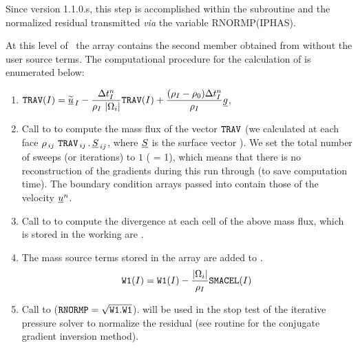 Since version 1.1.0.s, this step is accomplished within the subroutine  and the normalized residual transmitted \textit{via} the variable RNORMP(IPHAS).

At this level of \CS \, the array  contains the second member obtained from  without the user source terms. The computational procedure for the calculation of  is enumerated below:

\begin{enumerate}

\item $\displaystyle \text{\texttt{TRAV}}(I) = \widetilde{\underline{u}}_{\,I} - \frac {\Delta t^n_I} {\rho_I \ |\Omega_i|} \text{\texttt{TRAV}}(I) + \frac{(\rho_I - \rho_0 ) \Delta t^n_I }{\rho_I} \underline{g}$,
\item Call to  to compute the mass flux of the vector $\text{\texttt{TRAV}}$ (we calculated at each face  $\displaystyle \rho_{\,ij} \ \var{TRAV}_{\,ij}\,.\,\vect{S}_{\,ij}$, where $\underline{S}$ is the surface vector ). We set the total number of sweeps (or iterations) to $1$ ( = 1), which means that there is no reconstruction of the gradients during this run through  (to save computation time). The boundary condition arrays passed into  contain those of the velocity $\underline{u}^n$.
\item Call to  to compute the divergence at each cell of the above mass flux, which is stored in the working are .
\item The mass source terms stored in the array  are added to .
\begin{equation}
\text{\texttt{W1}}(I) = \text{\texttt{W1}}(I) - \frac{|\Omega_i|}{\rho_I} \text{\texttt{SMACEL}}(I)
\label {SM1}
\end{equation}
\item Call to  ($\text{\texttt{RNORMP}} = \sqrt{\text{\texttt{W1}}.\text{\texttt{W1}}}$).  will be used in the stop test of the iterative pressure solver to normalize the residual (see routine  for the conjugate gradient inversion method).

\end{enumerate}


